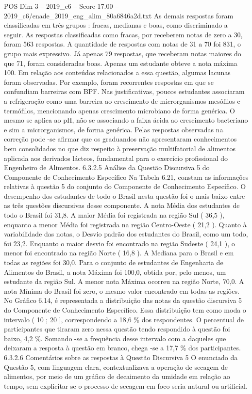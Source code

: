 \begin{textsample}{POS Dim 3 – 2019\_c6 – Score 17.00 – 2019\_c6/enade\_2019\_eng\_alim\_80a6846a2d.txt}
As demais respostas foram classificadas em três grupos : fracas, medianas e boas, como discriminado a seguir.
As respostas classificadas como fracas, por receberem notas de zero a 30, foram 563 respostas.
A quantidade de respostas com notas de 31 a 70 foi 831, o grupo mais expressivo.
Já apenas 79 respostas, que receberam notas maiores do que 71, foram consideradas boas.
Apenas um estudante obteve a nota máxima 100.
Em relação aos conteúdos relacionados a essa questão, algumas lacunas foram observadas.
Por exemplo, foram recorrentes respostas em que se confundiam barreiras com BPF.
Nas justificativas, poucos estudantes associaram a refrigeração como uma barreira ao crescimento de microrganismos mesófilos e termófilos, mencionando apenas crescimento microbiano de forma genérica.
O mesmo se aplica ao pH, não se associando a faixa ácida ao crescimento bacteriano e sim a microrganismos, de forma genérica.
Pelas respostas observadas na correção pode -se afirmar que os graduandos não apresentaram conhecimentos bem consolidados no que diz respeito à preservação multifatorial de alimentos aplicada aos derivados lácteos, fundamental para o exercício profissional do Engenheiro de Alimentos. 6.3.2.5 Análise da Questão Discursiva 5 do Componente de Conhecimento Específico Na Tabela 6.21, constam as informações relativas à questão 5 do conjunto do Componente de Conhecimento Específico.
O desempenho dos estudantes de todo o Brasil nesta questão foi o mais baixo entre as três questões discursivas desse componente.
A nota Média dos estudantes de todo o Brasil foi 31,8.
A maior Média foi registrada na região Sul ( 36,5 ), enquanto a menor Média foi registrada na região Centro-Oeste ( 21,2 ).
Quanto à variabilidade das notas, o Desvio padrão dos estudantes do Brasil, como um todo, foi 23,2.
Enquanto o maior desvio foi encontrado na região Sudeste ( 24,1 ), o menor foi encontrado na região Norte ( 16,8 ).
A Mediana para o Brasil e em todas as regiões foi 30,0.
Para o conjunto de estudantes de Engenharia de Alimentos do Brasil, a nota Máxima foi 100,0, obtida por, pelo menos, um estudante da região Sul.
A menor nota Máxima ocorreu na região Norte, 70,0.
A nota Mínima do Brasil foi zero, o mesmo valor encontrado em todas as regiões.
No Gráfico 6.14, é representada a distribuição das notas da questão discursiva 5 do Componente de Conhecimento Específico.
Essa distribuição tem como moda o intervalo ( 10 ; 20 ], correspondendo a 18,6 \% dos respondentes.
O percentual de participantes que tiraram zero nessa questão tendo respondido à questão foi baixo, 4,2 \%.
Somando -se a frequência desse intervalo com a daqueles que deixaram a resposta à questão em branco, chega -se a 17,7 \% dos participantes. 6.3.2.6 Comentários sobre as respostas à Questão Discursiva 5 O enunciado da Questão 5, com linguagem clara, contextualizava a operação de secagem de alimentos, por meio de um gráfico de decaimento da umidade em relação ao tempo, sem explicitar se o processo de secagem em foco seria natural ou artificial.

\end{textsample}
